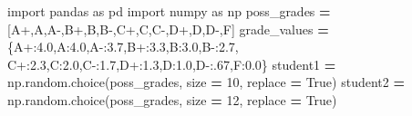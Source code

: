 \documentclass[
  12pt,
]{krantz}
\makeatletter
\newenvironment{Shaded}{\begin{snugshade}}{\end{snugshade}}
\newcommand{\DecValTok}[1]{\textcolor[rgb]{0.06,0.06,0.06}{#1}}
\newcommand{\FloatTok}[1]{\textcolor[rgb]{0.06,0.06,0.06}{#1}}
\newcommand{\ImportTok}[1]{#1}
\newcommand{\NormalTok}[1]{#1}
\newcommand{\OperatorTok}[1]{\textcolor[rgb]{0.43,0.43,0.43}{\textbf{#1}}}
\newcommand{\StringTok}[1]{\textcolor[rgb]{0.5,0.5,0.5}{#1}}
\newcommand{\VariableTok}[1]{\textcolor[rgb]{0,0,0}{#1}}
\newenvironment{kframe}{%
\medskip{}
\setlength{\fboxsep}{.8em}
 \def\at@end@of@kframe{}%
 \ifinner\ifhmode%
  \def\at@end@of@kframe{\end{minipage}}%
  \begin{minipage}{\columnwidth}%
 \fi\fi%
 \def\FrameCommand##1{\hskip\@totalleftmargin \hskip-\fboxsep
 \colorbox{shadecolor}{##1}\hskip-\fboxsep
     \hskip-\linewidth \hskip-\@totalleftmargin \hskip\columnwidth}%
 \MakeFramed {\advance\hsize-\width
   \@totalleftmargin\z@ \linewidth\hsize
   \@setminipage}}%
 {\par\unskip\endMakeFramed%
 \at@end@of@kframe}
\renewenvironment{Shaded}{\begin{kframe}}{\end{kframe}}
\makeatother
\begin{document}
\begin{Shaded}
\begin{Highlighting}[]
\ImportTok{import}\NormalTok{ pandas }\ImportTok{as}\NormalTok{ pd}
\ImportTok{import}\NormalTok{ numpy }\ImportTok{as}\NormalTok{ np}
\NormalTok{poss\_grades }\OperatorTok{=}\NormalTok{ [}\StringTok{\textquotesingle{}A+\textquotesingle{}}\NormalTok{,}\StringTok{\textquotesingle{}A\textquotesingle{}}\NormalTok{,}\StringTok{\textquotesingle{}A{-}\textquotesingle{}}\NormalTok{,}\StringTok{\textquotesingle{}B+\textquotesingle{}}\NormalTok{,}\StringTok{\textquotesingle{}B\textquotesingle{}}\NormalTok{,}\StringTok{\textquotesingle{}B{-}\textquotesingle{}}\NormalTok{,}\StringTok{\textquotesingle{}C+\textquotesingle{}}\NormalTok{,}\StringTok{\textquotesingle{}C\textquotesingle{}}\NormalTok{,}\StringTok{\textquotesingle{}C{-}\textquotesingle{}}\NormalTok{,}\StringTok{\textquotesingle{}D+\textquotesingle{}}\NormalTok{,}\StringTok{\textquotesingle{}D\textquotesingle{}}\NormalTok{,}\StringTok{\textquotesingle{}D{-}\textquotesingle{}}\NormalTok{,}\StringTok{\textquotesingle{}F\textquotesingle{}}\NormalTok{]}
\NormalTok{grade\_values }\OperatorTok{=}\NormalTok{ \{}\StringTok{\textquotesingle{}A+\textquotesingle{}}\NormalTok{:}\FloatTok{4.0}\NormalTok{,}\StringTok{\textquotesingle{}A\textquotesingle{}}\NormalTok{:}\FloatTok{4.0}\NormalTok{,}\StringTok{\textquotesingle{}A{-}\textquotesingle{}}\NormalTok{:}\FloatTok{3.7}\NormalTok{,}\StringTok{\textquotesingle{}B+\textquotesingle{}}\NormalTok{:}\FloatTok{3.3}\NormalTok{,}\StringTok{\textquotesingle{}B\textquotesingle{}}\NormalTok{:}\FloatTok{3.0}\NormalTok{,}\StringTok{\textquotesingle{}B{-}\textquotesingle{}}\NormalTok{:}\FloatTok{2.7}\NormalTok{,}
                \StringTok{\textquotesingle{}C+\textquotesingle{}}\NormalTok{:}\FloatTok{2.3}\NormalTok{,}\StringTok{\textquotesingle{}C\textquotesingle{}}\NormalTok{:}\FloatTok{2.0}\NormalTok{,}\StringTok{\textquotesingle{}C{-}\textquotesingle{}}\NormalTok{:}\FloatTok{1.7}\NormalTok{,}\StringTok{\textquotesingle{}D+\textquotesingle{}}\NormalTok{:}\FloatTok{1.3}\NormalTok{,}\StringTok{\textquotesingle{}D\textquotesingle{}}\NormalTok{:}\FloatTok{1.0}\NormalTok{,}\StringTok{\textquotesingle{}D{-}\textquotesingle{}}\NormalTok{:}\FloatTok{.67}\NormalTok{,}\StringTok{\textquotesingle{}F\textquotesingle{}}\NormalTok{:}\FloatTok{0.0}\NormalTok{\}}
\NormalTok{student1 }\OperatorTok{=}\NormalTok{ np.random.choice(poss\_grades, size }\OperatorTok{=} \DecValTok{10}\NormalTok{, replace }\OperatorTok{=} \VariableTok{True}\NormalTok{)}
\NormalTok{student2 }\OperatorTok{=}\NormalTok{ np.random.choice(poss\_grades, size }\OperatorTok{=} \DecValTok{12}\NormalTok{, replace }\OperatorTok{=} \VariableTok{True}\NormalTok{)}
\end{Highlighting}
\end{Shaded}
\end{document}
